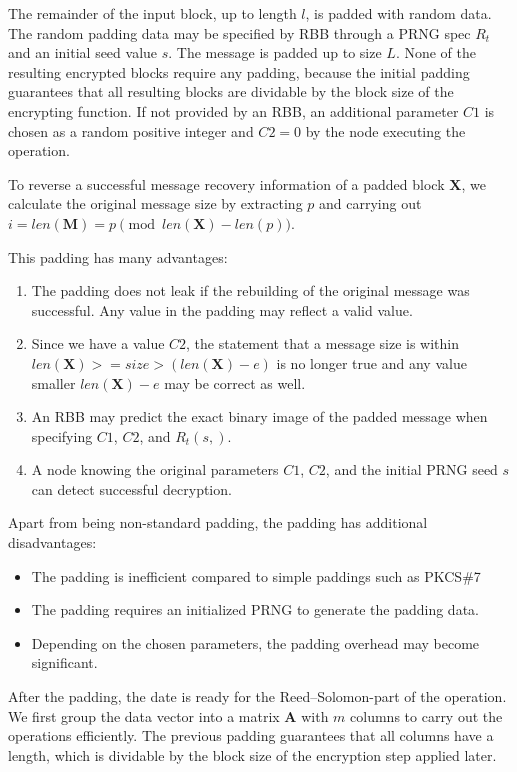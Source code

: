 The remainder of the input block, up to length $l$, is padded with random data. The random padding data may be specified by RBB through a PRNG spec $R_t$ and an initial seed value $s$. The message is padded up to size $L$. None of the resulting encrypted blocks require any padding, because the initial padding guarantees that all resulting blocks are dividable by the block size of the encrypting function. If not provided by an RBB, an additional parameter $C1$ is chosen as a random positive integer and $C2=0$  by the node executing the operation.

To reverse a successful message recovery information of a padded block $\mathbf{X}$, we calculate the original message size by extracting $p$ and carrying out $i=len(\mathbf{M})=p \pmod{ len\left(\mathbf{X}\right)-len\left(p\right) }$.

This padding has many advantages:
\begin{enumerate}
	\item The padding does not leak if the rebuilding of the original message was successful. Any value in the padding may reflect a valid value.
	\item Since we have a value $C2$, the statement that a message size is within $len(\mathbf{X})>=size>(len(\mathbf{X})-e)$ is no longer true and any value smaller $len(\mathbf{X})-e$ may be correct as well.
	\item An RBB may predict the exact binary image of the padded message when specifying $C1$, $C2$, and $R_{t}(s,)$.
	\item A node knowing the original parameters $C1$, $C2$, and the initial PRNG seed $s$ can detect successful decryption.
\end{enumerate}

Apart from being non-standard padding, the padding has additional disadvantages:
\begin{itemize}
	\item The padding is inefficient compared to simple paddings such as PKCS\#7
	\item The padding requires an initialized PRNG to generate the padding data.
	\item Depending on the chosen parameters, the padding overhead may become significant. 
\end{itemize}

After the padding, the date is ready for the Reed--Solomon-part of the operation. We first group the data vector into a matrix $\mathbf{A}$ with $m$ columns to carry out the operations efficiently. The previous padding guarantees that all columns have a length, which is dividable by the block size of the encryption step applied later.

